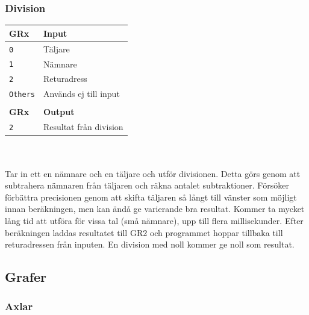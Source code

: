 \documentclass[]{article}
\begin{document}
\subsubsection{Division}
\begin{tabular}{ll}
	\textbf{GRx}    & \textbf{Input}         \\ \hline
	\texttt{0}      & Täljare                \\
	\texttt{1}      & Nämnare                \\
	\texttt{2}      & Returadress            \\
	\texttt{Others} & Används ej till input  \\
	                &  \\
	\textbf{GRx}    & \textbf{Output}        \\ \hline
	\texttt{2}      & Resultat från division
\end{tabular}
\\\\
\noindent
Tar in ett en nämnare och en täljare och utför divisionen. Detta görs genom att subtrahera nämnaren från täljaren och räkna antalet subtraktioner. Försöker förbättra precisionen genom att skifta täljaren så långt till vänster som möjligt innan beräkningen, men kan ändå ge varierande bra resultat. Kommer ta mycket lång tid att utföra för vissa tal (små nämnare), upp till flera millisekunder. Efter beräkningen laddas resultatet till GR2 och programmet hoppar tillbaka till returadressen från inputen. En division med noll kommer ge noll som resultat.

\subsection{Grafer}
\subsubsection{Axlar}
\end{document}
